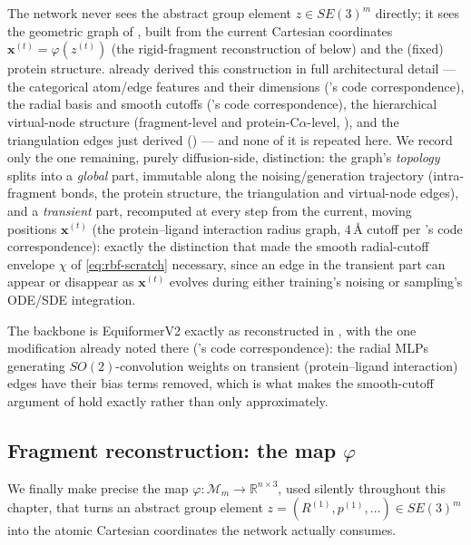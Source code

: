 \documentclass[11pt,a4paper]{report}
\theoremstyle{definition}
\theoremstyle{remark}
\newcommand{\RR}{\mathbb R}
\begin{document}
The network never sees the abstract group element $z\in SE(3)^m$ directly;
it sees the geometric graph of , built
from the current Cartesian coordinates $\mathbf x^{(t)}=\varphi(z^{(t)})$
(the rigid-fragment reconstruction of 
below) and the (fixed) protein structure.  already
derived this construction in full architectural detail --- the categorical
atom/edge features and their dimensions
('s code correspondence), the radial basis and
smooth cutoffs ('s code correspondence), the
hierarchical virtual-node structure (fragment-level and protein-C$\alpha$-level,
), and the triangulation edges just derived
() --- and none of it is repeated here. We
record only the one remaining, purely diffusion-side, distinction: the
graph's \emph{topology} splits into a \emph{global} part, immutable along
the noising/generation trajectory (intra-fragment bonds, the protein
structure, the triangulation and virtual-node edges), and a
\emph{transient} part, recomputed at every step from the current, moving
positions $\mathbf x^{(t)}$ (the protein--ligand interaction radius graph,
$4\,$\r A cutoff per 's code correspondence): exactly
the distinction that made the smooth radial-cutoff envelope
$\chi$ of \eqref{eq:rbf-scratch} necessary, since an edge in the transient
part can appear or disappear as $\mathbf x^{(t)}$ evolves during either
training's noising or sampling's ODE/SDE integration.

The backbone is EquiformerV2 exactly as reconstructed in
, with the one modification already noted there
('s code correspondence): the radial MLPs generating
$SO(2)$-convolution weights on transient (protein--ligand interaction)
edges have their bias terms removed, which is what makes the smooth-cutoff
argument of  hold exactly rather than only
approximately.

\subsection{Fragment reconstruction: the map $\varphi$}
\label{sec:fragment-reconstruction}

We finally make precise the map $\varphi:\mathcal M_m\to\RR^{n\times3}$,
used silently throughout this chapter, that turns an abstract group
element $z=(R^{(1)},p^{(1)},\dots)\in SE(3)^m$ into the atomic Cartesian
coordinates the network actually consumes.
\end{document}
